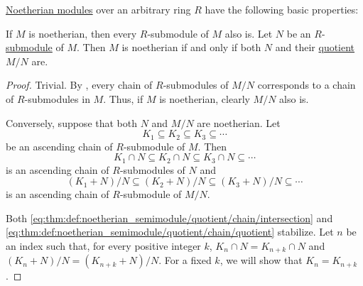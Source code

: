 \begin{proposition}\label{thm:def:noetherian_semimodule}
  \hyperref[def:noetherian_semimodule]{Noetherian modules} over an arbitrary ring \( R \) have the following basic properties:
  \begin{thmenum}
     If \( M \) is noetherian, then every \( R \)-submodule of \( M \) also is.
     Let \( N \) be an \( R \)-\hyperref[def:module/submodel]{submodule} of \( M \). Then \( M \) is noetherian if and only if both \( N \) and their \hyperref[def:module/quotient]{quotient} \( M / N \) are.
  \end{thmenum}
\end{proposition}
\begin{proof}
   Trivial.
   By , every chain of \( R \)-submodules of \( M / N \) corresponds to a chain of \( R \)-submodules in \( M \). Thus, if \( M \) is noetherian, clearly \( M / N \) also is.

  Conversely, suppose that both \( N \) and \( M / N \) are noetherian. Let
  \begin{equation}\label{eq:thm:def:noetherian_semimodule/quotient/chain}
    K_1 \subseteq K_2 \subseteq K_3 \subseteq \cdots
  \end{equation}
  be an ascending chain of \( R \)-submodule of \( M \). Then
  \begin{equation}\label{eq:thm:def:noetherian_semimodule/quotient/chain/intersection}
    K_1 \cap N \subseteq K_2 \cap N \subseteq K_3 \cap N \subseteq \cdots
  \end{equation}
  is an ascending chain of \( R \)-submodules of \( N \) and
  \begin{equation}\label{eq:thm:def:noetherian_semimodule/quotient/chain/quotient}
    (K_1 + N) / N \subseteq (K_2 + N) / N \subseteq (K_3 + N) / N \subseteq \cdots
  \end{equation}
  is an ascending chain of \( R \)-submodule of \( M / N \).

  Both \eqref{eq:thm:def:noetherian_semimodule/quotient/chain/intersection} and \eqref{eq:thm:def:noetherian_semimodule/quotient/chain/quotient} stabilize. Let \( n \) be an index such that, for every positive integer \( k \), \( K_n \cap N = K_{n + k} \cap N \) and \( (K_n + N) / N = (K_{n + k} + N) / N \). For a fixed \( k \), we will show that \( K_n = K_{n + k} \).


\end{proof}
